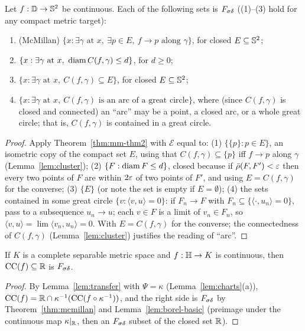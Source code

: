 \begin{corollary}\label{cor:mm-corollaries}
Let $f:\mathbb{D}\to\mathbb{S}^2$ be continuous. Each of the following sets is $F_{\sigma\delta}$ ((1)--(3) hold for any compact metric
target):
\begin{enumerate}[label=(\arabic*)]
\item (McMillan) $\{x:\exists\gamma\text{ at }x,\ \exists p\in E,\ f\to p\text{ along }\gamma\}$, for closed
  $E\subseteq\mathbb{S}^2$;
\item $\{x:\exists\gamma\text{ at }x,\ \operatorname{diam} C(f,\gamma)\le d\}$, for $d\ge0$;
\item $\{x:\exists\gamma\text{ at }x,\ C(f,\gamma)\subseteq E\}$, for closed $E\subseteq\mathbb{S}^2$;
\item $\{x:\exists\gamma\text{ at }x,\ C(f,\gamma)\text{ is an arc of a great circle}\}$, where (since
  $C(f,\gamma)$ is closed and connected) an ``arc'' may be a point, a closed arc, or a whole great circle; that is,
  $C(f,\gamma)$ is contained in a great circle.
\end{enumerate}
\end{corollary}
\begin{proof}
Apply Theorem~\ref{thm:mm-thm2} with $\mathcal E$ equal to: (1) $\{\{p\}:p\in E\}$, an isometric copy of
the compact set $E$, using that $C(f,\gamma)\subseteq\{p\}$ iff $f\to p$ along $\gamma$ (Lemma~\ref{lem:cluster});
(2) $\{F:\operatorname{diam} F\le d\}$, closed because if $\bar\rho(F,F')<\varepsilon$ then every two points of $F$ are within
$2\varepsilon$ of two points of $F'$, and using $E=C(f,\gamma)$ for the converse; (3) $\{E\}$ (or note the set is empty if
$E=\emptyset$); (4) the sets contained in some great circle $\{v:\langle v,u\rangle=0\}$: if $F_n\to F$ with
$F_n\subseteq\{\langle\cdot,u_n\rangle=0\}$, pass to a subsequence $u_n\to u$; each $v\in F$ is a limit of
$v_n\in F_n$, so $\langle v,u\rangle=\lim\langle v_n,u_n\rangle=0$. With $E=C(f,\gamma)$ for the converse; the
connectedness of $C(f,\gamma)$ (Lemma~\ref{lem:cluster}) justifies the reading of ``arc''.
\end{proof}

\begin{theorem}\label{thm:mcmillan-H}
If $K$ is a complete separable metric space and $f:\mathbb{H}\to K$ is continuous, then $\operatorname{CC}(f)\subseteq\mathbb{R}$ is
$F_{\sigma\delta}$.
\end{theorem}
\begin{proof}
By Lemma~\ref{lem:transfer} with $\Psi=\kappa$ (Lemma~\ref{lem:charts}(a)),
$\operatorname{CC}(f)=\mathbb{R}\cap\kappa^{-1}(\operatorname{CC}(f\circ\kappa^{-1}))$, and the right side is $F_{\sigma\delta}$ by
Theorem~\ref{thm:mcmillan} and Lemma~\ref{lem:borel-basic} (preimage under the continuous map $\kappa|_{\mathbb{R}}$, then
an $F_{\sigma\delta}$ subset of the closed set $\mathbb{R}$).
\end{proof}

